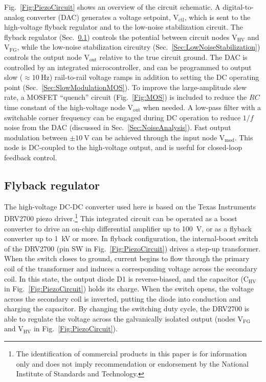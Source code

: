 \documentclass[aip,rsi,reprint]{revtex4-1} %
\begin{document}
Fig.~\ref{Fig:PiezoCircuit} shows an overview of the circuit schematic. 
A digital-to-analog converter (DAC) generates a voltage setpoint, $\text{V}_\text{ctl}$, which is sent to the high-voltage flyback regulator and to the low-noise stabilization circuit.
The flyback regulator (Sec.~\ref{Sec:DRV2700}) controls the potential between circuit nodes $\text{V}_\text{HV}$ and $\text{V}_\text{FG}$, while the low-noise stabilization circuitry (Sec.~\ref{Sec:LowNoiseStabilization}) controls the output node $\text{V}_\text{out}$ relative to the true circuit ground.
The DAC is controlled by an integrated microcontroller, and can be programmed to output slow ($\approx\SI{10}{\hertz}$) rail-to-rail voltage ramps in addition to setting the DC operating point (Sec.~\ref{Sec:SlowModulationMOS}).
To improve the large-amplitude slew rate, a MOSFET ``quench'' circuit (Fig.~\ref{Fig:MOS}) is included to reduce the $RC$ time constant of the high-voltage node $\text{V}_\text{out}$ when needed.
A low-pass filter with a switchable corner frequency can be engaged during DC operation to reduce $1/f$ noise from the DAC (discussed in Sec.~\ref{Sec:NoiseAnalysis}).
Fast output modulation between $\pm\SI{10}{\volt}$ can be achieved through the input node $\text{V}_\text{mod}$.
This node is DC-coupled to the high-voltage output, and is useful for closed-loop feedback control.




\subsection{Flyback regulator}
\label{Sec:DRV2700}

The high-voltage DC-DC converter used here is based on the Texas Instruments DRV2700 piezo driver.\footnote{The identification of commercial products in this paper is for information only and does not imply recommendation or endorsement by the National Institute of Standards and Technology.}
This integrated circuit can be operated as a boost converter to drive an on-chip differential amplifier up to \SI{100}{\volt}, or as a flyback converter up to \SI{1}{\kilo\volt} or more.
In flyback configuration, the internal-boost switch of the DRV2700 (pin SW in Fig.~\ref{Fig:PiezoCircuit}) drives a step-up transformer.
When the switch closes to ground, current begins to flow through the primary coil of the transformer and induces a corresponding voltage across the secondary coil.
In this state, the output diode D1 is reverse-biased, and the capacitor ($\text{C}_{\text{HV}}$ in Fig.~\ref{Fig:PiezoCircuit}) holds its charge.
When the switch opens, the voltage across the secondary coil is inverted, putting the diode into conduction and charging the capacitor.
By changing the switching duty cycle, the DRV2700 is able to regulate the voltage across the galvanically isolated output (nodes $\text{V}_\text{FG}$ and $\text{V}_\text{HV}$ in Fig.~\ref{Fig:PiezoCircuit}).
\end{document}
